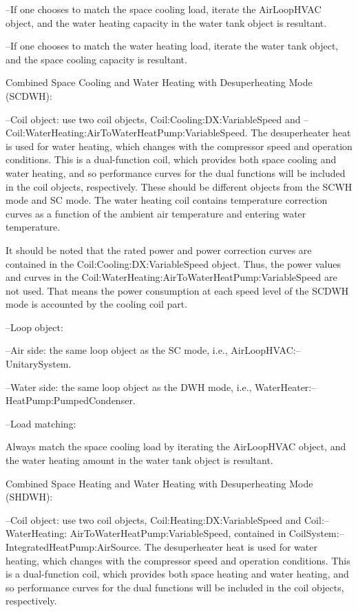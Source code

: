 --If one chooses to match the space cooling load, iterate the AirLoopHVAC object, and the water heating capacity in the water tank object is resultant.

--If one chooses to match the water heating load, iterate the water tank object, and the space cooling capacity is resultant.

Combined Space Cooling and Water Heating with Desuperheating Mode (SCDWH):

--Coil object: use two coil objects, Coil:Cooling:DX:VariableSpeed and -- Coil:WaterHeating:AirToWaterHeatPump:VariableSpeed. The desuperheater heat is used for water heating, which changes with the compressor speed and operation conditions. This is a dual-function coil, which provides both space cooling and water heating, and so performance curves for the dual functions will be included in the coil objects, respectively. These should be different objects from the SCWH mode and SC mode. The water heating coil contains temperature correction curves as a function of the ambient air temperature and entering water temperature. 

It should be noted that the rated power and power correction curves are contained in the Coil:Cooling:DX:VariableSpeed object. Thus, the power values and curves in the Coil:WaterHeating:AirToWaterHeatPump:VariableSpeed are not used. That means the power consumption at each speed level of the SCDWH mode is accounted by the cooling coil part. 

--Loop object: 

--Air side: the same loop object as the SC mode, i.e., AirLoopHVAC:--UnitarySystem.

--Water side:  the same loop object as the DWH mode, i.e., WaterHeater:--HeatPump:PumpedCondenser.

--Load matching: 

Always match the space cooling load by iterating the AirLoopHVAC object, and the water heating amount in the water tank object is resultant.

Combined Space Heating and Water Heating with Desuperheating Mode (SHDWH):

--Coil object: use two coil objects, Coil:Heating:DX:VariableSpeed and Coil:--WaterHeating: AirToWaterHeatPump:VariableSpeed, contained in CoilSystem:--IntegratedHeatPump:AirSource. The desuperheater heat is used for water heating, which changes with the compressor speed and operation conditions. This is a dual-function coil, which provides both space heating and water heating, and so performance curves for the dual functions will be included in the coil objects, respectively. 

